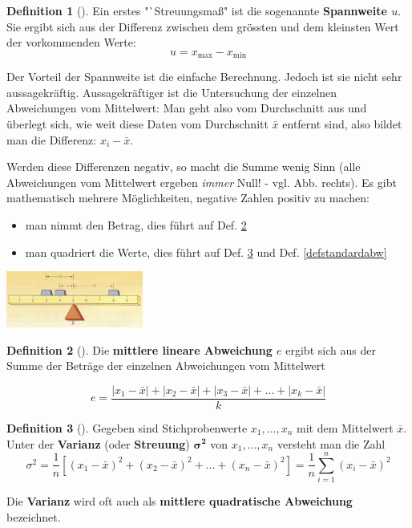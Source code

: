 \documentclass[a4paper, twoside, parskip, 10pt, smallheadings]{scrbook}
\theoremstyle{plain}
\theoremstyle{definition}
\newtheorem{Def}{Definition}%
\newenvironment{fshaded}{%
\def\FrameCommand{\fcolorbox{framecolor}{shadecolor}}%
\MakeFramed {\FrameRestore}}%
{\endMakeFramed}
\newenvironment{fdef}[1][]{\definecolor{shadecolor}{rgb}{1,1,.29}%
\definecolor{framecolor}{rgb}{1,1,0}%
\begin{fshaded}\begin{Def}[#1]}{\end{Def}\end{fshaded}}
\newcommand{\bi}{\begin{itemize}}
\newcommand{\ei}{\end{itemize}}
\newcommand{\bd}{\begin{fdef}}
\newcommand{\ed}{\end{fdef}}
\begin{document}
\bd  
Ein erstes "`Streuungsma{\ss}" ist die sogenannte {\bf Spannweite $u$}. Sie ergibt sich aus der Differenz
zwischen dem gr\"{o}ssten und dem kleinsten Wert der vorkommenden Werte:
$$u=x_{\mbox{max}}-x_{\mbox{min}}$$
\ed  

Der Vorteil der Spannweite ist die einfache Berechnung. Jedoch ist sie nicht sehr aussagekr\"{a}ftig. Aussagekräftiger ist die Untersuchung der einzelnen Abweichungen vom Mittelwert: Man geht also vom Durchschnitt
aus und \"{u}berlegt sich, wie weit diese Daten vom Durchschnitt $\bar{x}$ entfernt sind, also bildet
man die Differenz: $x_i-\bar{x}$. 


\begin{minipage}{10cm}
Werden diese Differenzen negativ, so macht die Summe wenig Sinn (alle Abweichungen vom Mittelwert ergeben {\it immer} Null! - vgl. Abb. rechts). Es gibt mathematisch mehrere Möglichkeiten, negative Zahlen positiv zu machen: \bi \item man nimmt den Betrag, dies führt auf Def. \ref{defmitlinabw} 
\item man quadriert die Werte, dies führt auf Def. \ref{defvar} und Def. \ref{defstandardabw}\ei 
\end{minipage}
\begin{minipage}{5cm}
\begin{flushright}
\includegraphics[width=4.5cm]{2te/beschreibendestatistik/bilder/abb1.jpg}
\end{flushright}
\end{minipage}


 \bd  \label{defmitlinabw}
Die {\bf mittlere lineare Abweichung $e$} ergibt sich aus der Summe der Beträge der einzelnen Abweichungen vom Mittelwert

$$e=\frac{|x_1-\bar{x}|+|x_2-\bar{x}|+|x_3-\bar{x}|+\dots+|x_k-\bar{x}|}{k}$$
\ed   


\bd \label{defvar}
Gegeben sind Stichprobenwerte $x_1,\dots, x_n$ mit dem Mittelwert $\bar{x}$. Unter der {\bf
Varianz} (oder {\bf Streuung}) $\mathbf{\sigma^2}$ von $x_1, \dots, x_n$ versteht man die Zahl
\[\sigma^2=\frac{1}{n}[(x_1-\bar{x})^2+(x_2-\bar{x})^2+\dots+(x_n-\bar{x})^2]=\frac{1}{n}\sum_{i=1}^n(x_i-\bar{x})^2\]



Die {\bf Varianz} wird oft auch als {\bf mittlere quadratische Abweichung} bezeichnet.
\ed
\end{document}
